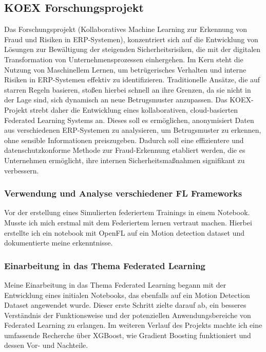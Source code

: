 \documentclass[11pt]{article}
\begin{document}
\subsection{KOEX Forschungsprojekt}
Das Forschungsprojekt (Kollaboratives Machine Learning zur Erkennung von Fraud und Risiken in ERP-Systemen), konzentriert sich auf die Entwicklung von Lösungen zur Bewältigung der steigenden Sicherheitsrisiken, die mit der digitalen Transformation von Unternehmensprozessen einhergehen. Im Kern steht die Nutzung von Maschinellem Lernen, um betrügerisches Verhalten und interne Risiken in ERP-Systemen effektiv zu identifizieren. Traditionelle Ansätze, die auf starren Regeln basieren, stoßen hierbei schnell an ihre Grenzen, da sie nicht in der Lage sind, sich dynamisch an neue Betrugsmuster anzupassen. Das KOEX-Projekt strebt daher die Entwicklung eines kollaborativen, cloud-basierten Federated Learning Systems an. Dieses soll es ermöglichen, anonymisiert Daten aus verschiedenen ERP-Systemen zu analysieren, um Betrugsmuster zu erkennen, ohne sensible Informationen preiszugeben. Dadurch soll eine effizientere und datenschutzkonforme Methode zur Fraud-Erkennung etabliert werden, die es Unternehmen ermöglicht, ihre internen Sicherheitsmaßnahmen signifikant zu verbessern.

\subsubsection{Verwendung und Analyse verschiedener FL Frameworks}
Vor der erstellung eines Simulierten federiertem Trainings in einem Notebook. Musste ich mich erstmal mit dem Federiertem lernen vertraut machen. Hierbei erstellte ich ein notebook mit OpenFL auf ein Motion detection dataset und dokumentierte meine erkenntnisse.

\subsubsection{Einarbeitung in das Thema Federated Learning}
Meine Einarbeitung in das Thema Federated Learning begann mit der Entwicklung eines initialen Notebooks, das ebenfalls auf ein Motion Detection Dataset angewendet wurde. Dieser erste Schritt zielte darauf ab, ein besseres Verständnis der Funktionsweise und der potenziellen Anwendungsbereiche von Federated Learning zu erlangen. 
\newline
Im weiteren Verlauf des Projekts machte ich eine umfassende Recherche über XGBoost, wie Gradient Boosting funktioniert und dessen Vor- und Nachteile.
\end{document}
